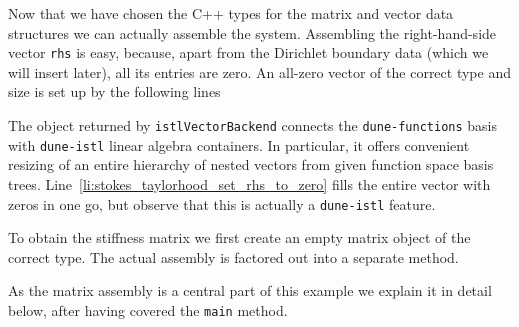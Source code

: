 \documentclass[a4paper,10pt,headings=normal,bibliography=totoc]{scrartcl}
\newcommand{\cpp}[1]{\lstinline[basicstyle=\ttfamily]!#1!}
\newcommand{\dunemodule}[1]{\texttt{#1}}
\begin{document}
Now that we have chosen the C++ types for the matrix and vector data structures we can actually assemble the system.
Assembling the right-hand-side vector \cpp{rhs} is easy, because, apart from the Dirichlet boundary data (which we
will insert later), all its entries are zero.  An all-zero vector of the correct type and size is set up by the
following lines
%

%
The object returned by \cpp{istlVectorBackend} connects the \dunemodule{dune-functions}
basis with \dunemodule{dune-istl} linear algebra containers.
In particular, it offers convenient resizing of an entire hierarchy of nested vectors
from given function space basis trees.
Line~\ref{li:stokes_taylorhood_set_rhs_to_zero} fills the entire vector with zeros
in one go, but observe that this is actually a \dunemodule{dune-istl} feature.

To obtain the stiffness matrix we first create an empty matrix object of the correct type.  The actual assembly
is factored out into a separate method.
%

%
As the matrix assembly is a central part of this example we explain it in detail below, after having covered the \cpp{main} method.
\end{document}
